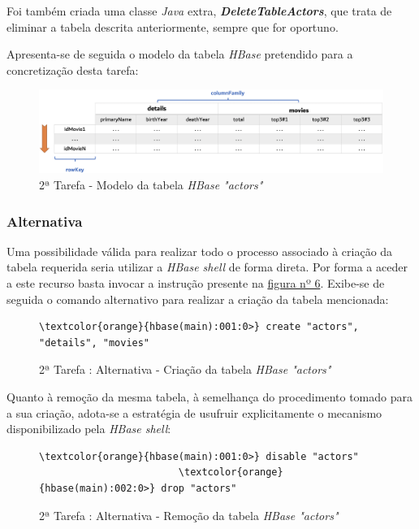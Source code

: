 \documentclass[a4paper]{report}
\begin{document}
{		Foi também criada uma classe \textit{Java} extra, \textbf{\textit{DeleteTableActors}}, que trata de eliminar a tabela descrita anteriormente, sempre que for oportuno.
        
        Apresenta-se de seguida o modelo da tabela \textit{HBase} pretendido para a concretização desta tarefa:
        \begin{figure}[H]
            \centering
            \includegraphics[width=1.0\textwidth]{Imagens/2ª Tarefa - Tabela Hbase.png}
            \caption{2ª Tarefa - Modelo da tabela \textit{HBase "actors"}}
            \label{fig:13}
        \end{figure}

			\subsubsection{Alternativa}
			Uma possibilidade válida para realizar todo o processo associado à criação da tabela requerida seria utilizar a \textit{HBase shell} de forma direta. Por forma a aceder a este recurso basta invocar a instrução presente na \hyperref[fig:6]{figura nº 6}.
			Exibe-se de seguida o comando alternativo para realizar a criação da tabela mencionada:

			\begin{figure}[H]
				{
					\color{teal}
					\begin{Verbatim}[commandchars=\\\{\}]
              \textcolor{orange}{hbase(main):001:0>} create "actors", "details", "movies"
					\end{Verbatim}
				}
				\caption{2ª Tarefa : Alternativa - Criação da tabela \textit{HBase "actors"}}
				\label{fig:14}
			\end{figure}
			
			Quanto à remoção da mesma tabela, à semelhança do procedimento tomado para a sua criação, adota-se a estratégia de usufruir explicitamente o mecanismo disponibilizado pela \textit{HBase shell}:
			\begin{figure}[H]
				{
					\color{teal}
					\begin{Verbatim}[commandchars=\\\{\}]
                        \textcolor{orange}{hbase(main):001:0>} disable "actors"
                        \textcolor{orange}{hbase(main):002:0>} drop "actors"
					\end{Verbatim}
				}
				\caption{2ª Tarefa : Alternativa - Remoção da tabela \textit{HBase "actors"}}
				\label{fig:15}
			\end{figure}

}
\end{document}
